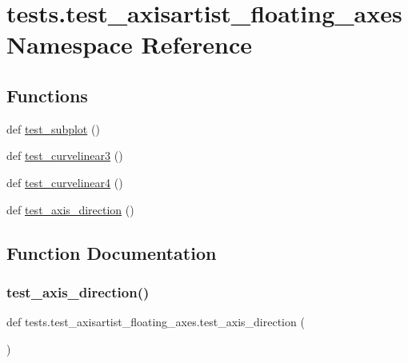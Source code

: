\hypertarget{namespacetests_1_1test__axisartist__floating__axes}{}\section{tests.\+test\+\_\+axisartist\+\_\+floating\+\_\+axes Namespace Reference}
\label{namespacetests_1_1test__axisartist__floating__axes}
\subsection*{Functions}
\begin{DoxyCompactItemize}
\item 
def \hyperlink{namespacetests_1_1test__axisartist__floating__axes_ad1d494872804969dbd00aef46bb9a0c5}{test\+\_\+subplot} ()
\item 
def \hyperlink{namespacetests_1_1test__axisartist__floating__axes_aaf626b16bf5ceb074ee8689a655b6e9a}{test\+\_\+curvelinear3} ()
\item 
def \hyperlink{namespacetests_1_1test__axisartist__floating__axes_a1607c767bb6a78b3eb9ec0b14b2ab67e}{test\+\_\+curvelinear4} ()
\item 
def \hyperlink{namespacetests_1_1test__axisartist__floating__axes_a5ba4958b8211fd1dcbe8186107434a27}{test\+\_\+axis\+\_\+direction} ()
\end{DoxyCompactItemize}


\subsection{Function Documentation}
\mbox{\label{namespacetests_1_1test__axisartist__floating__axes_a5ba4958b8211fd1dcbe8186107434a27}} 
\subsubsection{\texorpdfstring{test\+\_\+axis\+\_\+direction()}{test\_axis\_direction()}}
{\footnotesize\ttfamily def tests.\+test\+\_\+axisartist\+\_\+floating\+\_\+axes.\+test\+\_\+axis\+\_\+direction (\begin{DoxyParamCaption}{ }\end{DoxyParamCaption})}

